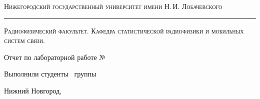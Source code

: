 \begin{titlepage}

\begin{center}

{\small\textsc{Нижегородский государственный университет имени Н.\,И. Лобачевского}}
\vskip 1pt \hrule \vskip 3pt
{\small\textsc{Радиофизический факультет. Кафедра статистической радиофизики и мобильных систем связи.}}

\vfill

{\Large Отчет по лабораторной работе №\labnumber\vskip 12pt\bfseries \labtheme}
	
\end{center}

\vfill
	
\begin{flushright}
	{Выполнили студенты \labgroup\ группы\\ \labauthors}%
\end{flushright}
	
\vfill
	
\begin{center}
	Нижний Новгород, \the\year
\end{center}

\end{titlepage}

